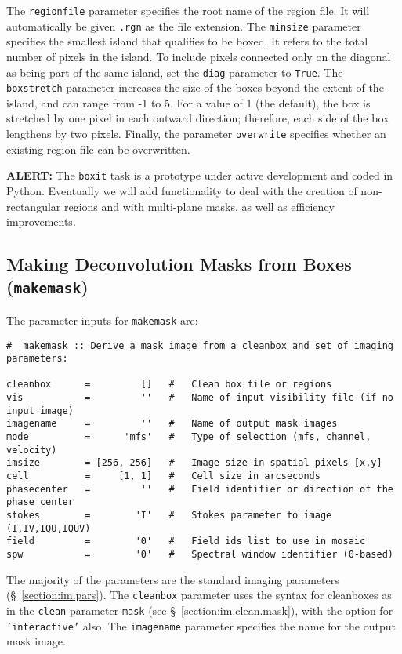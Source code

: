 The {\tt regionfile} parameter specifies the root name of the region file.  It
will automatically be given {\tt .rgn} as the file extension.  
The {\tt minsize} parameter specifies the smallest island that qualifies to be
boxed.  It refers to the total number of pixels in the island. 
To include pixels connected only on the diagonal as being part of the same
island, set the {\tt diag} parameter to {\tt True}.  The {\tt boxstretch}
parameter increases the size of the boxes beyond the extent of the island, and
can range from -1 to 5.  For a value of 1 (the default), the
box is stretched by one pixel in each outward direction; therefore, each side
of the box lengthens by two pixels.  Finally, the parameter {\tt overwrite}
specifies whether an existing region file can be overwritten.

{\bf ALERT:} The {\tt boxit} task is a prototype under active development and
coded in Python. Eventually we will add functionality to deal with the creation of
non-rectangular regions and with multi-plane masks, as well as efficiency
improvements.  %

\subsection{Making Deconvolution Masks from Boxes ({\tt makemask})}
\label{section:im.mask.makemask}

The parameter inputs for {\tt makemask} are:
\small
\begin{verbatim}
#  makemask :: Derive a mask image from a cleanbox and set of imaging parameters:

cleanbox      =         []   #   Clean box file or regions
vis           =         ''   #   Name of input visibility file (if no input image)
imagename     =         ''   #   Name of output mask images
mode          =      'mfs'   #   Type of selection (mfs, channel, velocity)
imsize        = [256, 256]   #   Image size in spatial pixels [x,y]
cell          =     [1, 1]   #   Cell size in arcseconds
phasecenter   =         ''   #   Field identifier or direction of the phase center
stokes        =        'I'   #   Stokes parameter to image (I,IV,IQU,IQUV)
field         =        '0'   #   Field ids list to use in mosaic
spw           =        '0'   #   Spectral window identifier (0-based)
\end{verbatim}
\normalsize 
The majority of the parameters are the standard imaging parameters
(\S~\ref{section:im.pars}).  The {\tt cleanbox} parameter uses the
syntax for cleanboxes as in the {\tt clean} parameter {\tt mask} (see
\S~\ref{section:im.clean.mask}), with the option for {\tt 'interactive'}
also.  The {\tt imagename} parameter specifies the name
for the output mask image.

